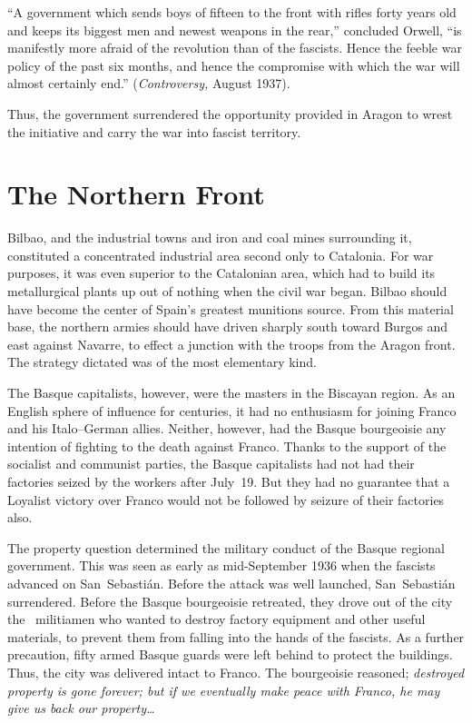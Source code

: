 ``A government which sends boys of fifteen to the front with rifles forty years old and keeps its biggest men and newest weapons in the rear,'' concluded Orwell, ``is manifestly more afraid of the revolution than of the fascists. Hence the feeble war policy of the past six months, and hence the compromise with which the war will almost certainly end.'' (\emph{Controversy,} August 1937).

Thus, the government surrendered the opportunity provided in Aragon to wrest the initiative and carry the war into fascist territory.

\section{The Northern Front}

Bilbao, and the industrial towns and iron and coal mines surrounding it, constituted a concentrated industrial area second only to Catalonia. For war purposes, it was even superior to the Catalonian area, which had to build its metallurgical plants up out of nothing when the civil war began. Bilbao should have become the center of Spain’s greatest munitions source. From this material base, the northern armies should have driven sharply south toward Burgos and east against Navarre, to effect a junction with the troops from the Aragon front. The strategy dictated was of the most elementary kind.

The Basque capitalists, however, were the masters in the Biscayan region. As an English sphere of influence for centuries, it had no enthusiasm for joining Franco and his Italo--German allies. Neither, however, had the Basque bourgeoisie any intention of fighting to the death against Franco. Thanks to the support of the socialist and communist parties, the Basque capitalists had not had their factories seized by the workers after July~19. But they had no guarantee that a Loyalist victory over Franco would not be followed by seizure of their factories also.
\noclub

\indexCNT{}
The property question determined the military conduct of the Basque regional government. This was seen as early as mid-Sep\-tem\-ber 1936 when the fascists advanced on San~Sebasti\'an. Before the attack was well launched, San~Sebasti\'an surrendered. Before the Basque bourgeoisie retreated, they drove out of the city the \CNT\ militiamen who wanted to destroy factory equipment and other useful materials, to prevent them from falling into the hands of the fascists. As a further precaution, fifty armed Basque guards were left behind to protect the buildings. Thus, the city was delivered intact to Franco. The bourgeoisie reasoned; \emph{destroyed property is gone forever; but if we eventually make peace with Franco, he may give us back our property\dots}

